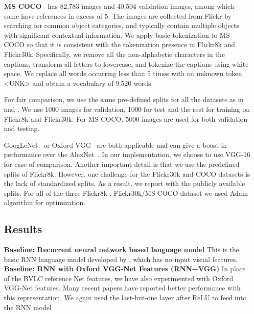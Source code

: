 \documentclass[10pt,twocolumn,letterpaper]{article}
\begin{document}
	\noindent\textbf{MS COCO~\cite{chen2015microsoft,lin2014microsoft}} has 82,783 images and 40,504 validation images, among which some have references in excess of 5. The images are collected from Flickr by searching for common object categories, and typically contain multiple objects with significant contextual information. We apply basic tokenization to MS COCO so that it is consistent with the tokenization presence in Flickr8k and Flickr30k. Specifically, we remove all the non-alphabetic characters in the captions, transform all letters to lowercase, and tokenize the captions using white space. We replace all words occurring less than 5 times with an unknown token <UNK> and obtain a vocabulary of 9,520 words.
	
	For fair comparison, we use the same pre-defined splits for all the datasets as in \cite{karpathy2015deep} and \cite{karpathy2014deep}. We use 1000 images for validation, 1000 for test and the rest for training on Flickr8k and Flickr30k. For MS COCO, 5000 images are used for both validation and testing.
	
	GoogLeNet~\cite{szegedy2015going} or Oxford VGG~\cite{simonyan2014very} are both applicable and can give a boost in performance over the AlexNet~\cite{krizhevsky2012imagenet}. In our implementation, we choose to use VGG-16\cite{simonyan2014very} for ease of comparison. Another important detail is that we use the predefined splits of Flickr8k. However, one challenge for the Flickr30k and COCO datasets is the lack of standardized splits. As a result, we report with the publicly available splits. For all of the three Flickr8k , Flickr30k/MS COCO dataset we used Adam algorithm\cite{kingma2014adam} for optimization.
	
	\subsection{Results}
	
	\textbf{Baseline: Recurrent neural network based language model}
	This is the basic RNN language model developed by \cite{mikolov2010recurrent} , which has no input visual features.\\
	
	\textbf{Baseline: RNN with Oxford VGG-Net Features (RNN+VGG)}
	In place of the BVLC reference Net features, we have also experimented with Oxford VGG-Net \cite{simonyan2014very} features. Many recent papers \cite{mao2014explain} have reported better performance with this representation. We again used the last-but-one layer after ReLU to feed into the RNN model \\
	
\end{document}
